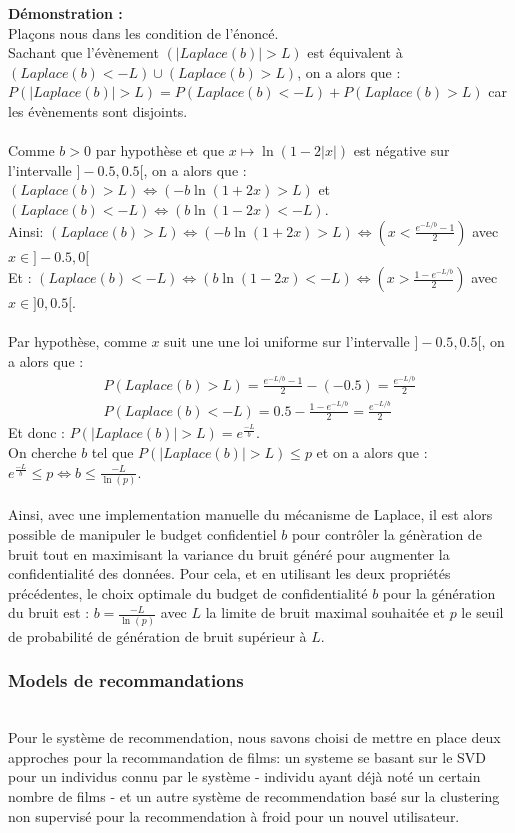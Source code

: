 \documentclass{article}
\begin{document}
\textbf{Démonstration :}\\
Plaçons nous dans les condition de l'énoncé.\\
Sachant que l'évènement $(|Laplace(b)| > L)$ est équivalent à $(Laplace(b)<-L) \cup (Laplace(b)>L)$, on a alors que :
\(P( |Laplace(b)| > L) = P(Laplace(b)<-L) + P(Laplace(b)>L) \) car les évènements sont disjoints.\\ 
\\
Comme $b>0$ par hypothèse et que $x\mapsto \ln(1 - 2|x|)$ est négative sur l'intervalle $]-0.5, 0.5[$, on a alors que : 
\( (Laplace(b)>L) \Leftrightarrow (-b \ln(1+2x)>L)\) et \( (Laplace(b)<-L) \Leftrightarrow (b \ln(1-2x)<-L)\). \\
Ainsi: $ (Laplace(b)>L) \Leftrightarrow ( -b \ln(1+2x)>L) \Leftrightarrow (x < \frac{ e^{-L/b}-1}{2})$ avec $x\in]-0.5,0[$\\
Et : $ (Laplace(b)<-L) \Leftrightarrow ( b \ln(1-2x)<-L) \Leftrightarrow (x > \frac{ 1-e^{-L/b}}{2})$ avec $x\in]0,0.5[$.\\
\\
Par hypothèse, comme $x$ suit une une loi uniforme sur l'intervalle $]-0.5, 0.5[$, on a alors que :
\begin{align*}
P(Laplace(b)>L) = \frac{ e^{-L/b}-1}{2} - (-0.5) = \frac{ e^{-L/b}}{2}\\
P(Laplace(b)<-L) = 0.5 - \frac{ 1-e^{-L/b}}{2} = \frac{ e^{-L/b}}{2}
\end{align*}
Et donc : $P( |Laplace(b)| > L) = e^{\frac{-L}{b}}$.\\
On cherche $b$ tel que $P( |Laplace(b)| > L) \leq p$ et on a alors que : $e^{\frac{-L}{b}} \leq p \Leftrightarrow b \leq \frac{-L}{\ln(p)}$.\\
\\
Ainsi, avec une implementation manuelle du mécanisme de Laplace, il est alors possible de manipuler le budget confidentiel $b$ pour contrôler 
la génèration de bruit tout en maximisant la variance du bruit généré pour augmenter la confidentialité des données. Pour cela, et en utilisant les deux propriétés précédentes,
le choix optimale du budget de confidentialité $b$ pour la génération du bruit est : $b = \frac{-L}{\ln(p)}$ avec $L$ la limite de bruit maximal souhaitée et $p$ le seuil de probabilité de génération de bruit supérieur à $L$.\\

\subsubsection{Models de recommandations}
$ $\\
Pour le système de recommendation, nous savons choisi de mettre en place deux approches pour la recommandation de films: un systeme se basant sur le SVD pour un 
individus connu par le système - individu ayant déjà noté un certain nombre de films - et un autre système de recommendation basé sur la clustering non supervisé 
pour la recommendation à froid pour un nouvel utilisateur.
\end{document}
